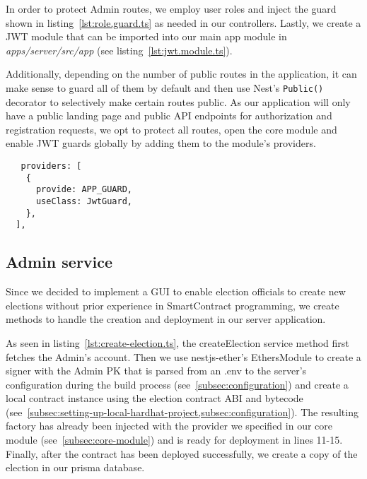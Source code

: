 In order to protect \gls{Admin} routes, we employ user roles and inject the guard shown in listing~\ref{lst:role.guard.ts} as needed in our controllers.
Lastly, we create a \gls{JWT} module that can be imported into our main app module in \emph{apps/server/src/app} (see listing~\ref{lst:jwt.module.ts}).


Additionally, depending on the number of public routes in the application, it can make sense to guard all of them by default and then use Nest's \texttt{Public()} decorator to selectively make certain routes public.
As our application will only have a public landing page and public \gls{API} endpoints for authorization and registration requests, we opt to protect all routes, open the core module and enable \gls{JWT} guards globally by adding them to the module's providers.

\begin{verbatim}
   providers: [
    {
      provide: APP_GUARD,
      useClass: JwtGuard,
    },
  ],
\end{verbatim}

\subsection{Admin service}\label{subsec:admin-service}

Since we decided to implement a \gls{GUI} to enable election officials to create new elections without prior experience in \gls{SmartContract} programming, we create methods to handle the creation and deployment in our server application.

As seen in listing~\ref{lst:create-election.ts}, the createElection service method first fetches the \gls{Admin}'s account.
Then we use nestjs-ether's EthersModule to create a signer with the \gls{Admin} \gls{PK} that is parsed from an .env to the server's configuration during the build process (see~\cref{subsec:configuration}) and create a local contract instance using the election contract \gls{ABI} and bytecode (see~\cref{subsec:setting-up-local-hardhat-project,subsec:configuration}).
The resulting factory has already been injected with the provider we specified in our core module (see~\cref{subsec:core-module}) and is ready for deployment in lines 11-15.
Finally, after the contract has been deployed successfully, we create a copy of the election in our prisma database.

